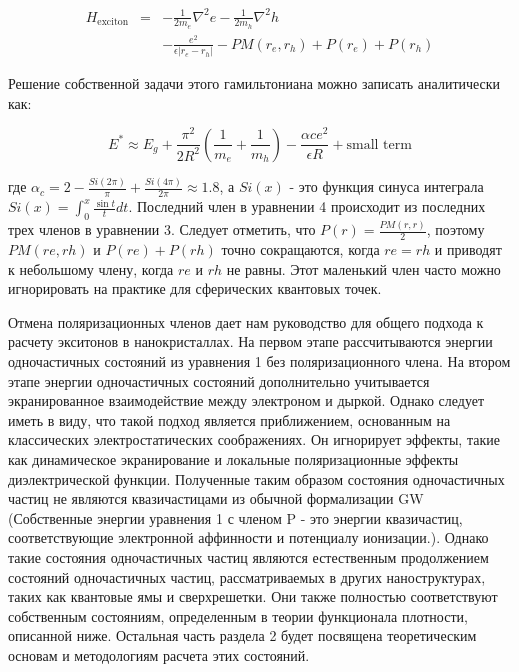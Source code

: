\documentclass[a4paper,14pt]{extarticle}
\begin{document}
\begin{eqnarray}
    H_{\text{exciton}} &=& -\frac{1}{2m_e} \nabla^2 e - \frac{1}{2m_h} \nabla^2 h \nonumber \\
    && - \frac{e^2}{\epsilon |r_e - r_h|} - PM(r_e, r_h) + P(r_e) + P(r_h)
    \end{eqnarray}
    
Решение собственной задачи этого гамильтониана можно записать аналитически как:

\begin{equation}
    E^* \approx E_g + \frac{\pi^2}{2R^2} \left( \frac{1}{m_e} + \frac{1}{m_h} \right) - \frac{\alpha ce^2}{\epsilon R} + \text{small term}
    \end{equation}

где \( \alpha_c = 2 - \frac{Si(2\pi)}{\pi} + \frac{Si(4\pi)}{2\pi} \approx 1.8 \), а \( Si(x) \) - это функция синуса интеграла \( Si(x) = \int_{0}^{x} \frac{\sin t}{t} dt \). Последний член в уравнении 4 происходит из последних трех членов в уравнении 3. Следует отметить, что \( P(r) = \frac{PM(r, r)}{2} \), поэтому \( PM(re, rh) \) и \( P(re) + P(rh) \) точно сокращаются, когда \( re = rh \) и приводят к небольшому члену, когда \( re \) и \( rh \) не равны. Этот маленький член часто можно игнорировать на практике для сферических квантовых точек.

Отмена поляризационных членов дает нам руководство для общего подхода к расчету экситонов в нанокристаллах. На первом этапе рассчитываются энергии одночастичных состояний из уравнения 1 без поляризационного члена. На втором этапе энергии одночастичных состояний дополнительно учитывается экранированное взаимодействие между электроном и дыркой. Однако следует иметь в виду, что такой подход является приближением, основанным на классических электростатических соображениях. Он игнорирует эффекты, такие как динамическое экранирование и локальные поляризационные эффекты диэлектрической функции. Полученные таким образом состояния одночастичных частиц не являются квазичастицами из обычной формализации GW (Собственные энергии уравнения 1 с членом P - это энергии квазичастиц, соответствующие электронной аффинности и потенциалу ионизации.). Однако такие состояния одночастичных частиц являются естественным продолжением состояний одночастичных частиц, рассматриваемых в других наноструктурах, таких как квантовые ямы и сверхрешетки. Они также полностью соответствуют собственным состояниям, определенным в теории функционала плотности, описанной ниже. Остальная часть раздела 2 будет посвящена теоретическим основам и методологиям расчета этих состояний.
\end{document}
